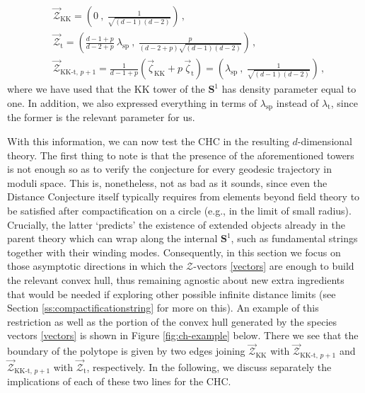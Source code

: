 %
\begin{equation} \label{vectors}
\begin{split} 
	&\vec{\mathcal{Z}}_{\text{KK}} = \left( 0 \ ,\ \frac{1}{\sqrt{(d-1)(d-2)}} \right) \, ,\\
	&\vec{\mathcal{Z}}_{\text{t}} = \left( \frac{d-1+p}{d-2+p} \ \lambda_\text{sp} \ ,\ \frac{p}{(d-2+p)\sqrt{(d-1)(d-2)}} \right) \, ,\\
	&\vec{\mathcal{Z}}_{\text{KK-t},\, p+1} = \frac{1}{d-1+p} \left( \vec{\zeta}_{\text{KK}} + p\, \vec{\zeta}_{\text{t}} \right) = \left( \lambda_\text{sp} \ ,\ \frac{1}{\sqrt{(d-1)(d-2)}} \right) \, ,
\end{split}
\end{equation}
%
where we have used that the KK tower of the $\mathbf{S}^1$ has density parameter equal to one. In addition, we also expressed everything in terms of $\lambda_{\text{sp}}$ instead of $\lambda_{\text{t}}$, since the former is the relevant parameter for us.

With this information, we can now test the CHC in the resulting $d$-dimensional theory. The first thing to note is that the presence of the aforementioned towers is not enough so as to verify the conjecture for every geodesic trajectory in moduli space. This is, nonetheless, not as bad as it sounds, since even the Distance Conjecture itself typically requires from elements beyond field theory to be satisfied after compactification on a circle (e.g., in the limit of small radius). Crucially, the latter `predicts' the existence of extended objects already in the parent theory which can wrap along the internal $\mathbf{S}^1$, such as fundamental strings together with their winding modes. Consequently, in this section we focus on those asymptotic directions in which the $\mathcal{Z}$-vectors \eqref{vectors} are enough to build the relevant convex hull, thus remaining agnostic about new extra ingredients that would be needed if exploring other possible infinite distance limits (see Section \ref{ss:compactificationstring} for more on this). An example of this restriction as well as the portion of the convex hull generated by the species vectors \eqref{vectors} is shown in Figure \ref{fig:ch-example} below. There we see that the boundary of the polytope is given by two edges joining $\vec{\mathcal{Z}}_{\text{KK}}$ with $\vec{\mathcal{Z}}_{\text{KK-t},\, p+1}$ and $\vec{\mathcal{Z}}_{\text{KK-t},\, p+1}$ with $\vec{\mathcal{Z}}_{\text{t}}$, respectively. In the following, we discuss separately the implications of each of these two lines for the CHC.

